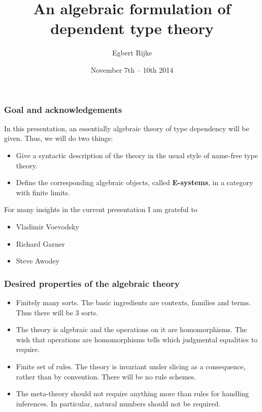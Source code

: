 \documentclass{beamer}
\title{\bf An algebraic formulation of dependent type theory}
\author{Egbert Rijke}
\institute{Carnegie Mellon University\\\texttt{erijke@andrew.cmu.edu}}
\date{November 7th -- 10th 2014}
\newcommand\important[1]{\textbf{\color{red!90!black}#1}}
\begin{document}
\begin{frame}
\titlepage
\end{frame}

\begin{frame}
\frametitle{\bf Goal and acknowledgements}
In this presentation, an essentially algebraic theory of type dependency will be given. Thus, we will
do two things:
\begin{itemize}
\item Give a syntactic description of the theory in the usual style of
name-free type theory.
\item Define the corresponding algebraic objects, called \important{E-systems}, in a category with finite limits.
\end{itemize}
\pause
For many insights in the current presentation I am grateful to
\begin{itemize}
\item Vladimir Voevodsky
\item Richard Garner
\item Steve Awodey
\end{itemize}
\end{frame}

\begin{frame}
\frametitle{\bf Desired properties of the algebraic theory}
\begin{itemize}
\item Finitely many sorts. The basic ingredients are contexts, families and
terms. Thus there will be 3 sorts.
\pause
\item The theory is algebraic and the operations on it are homomorphisms. The
wish that operations are homomorphisms tells which judgmental equalities to
require.
\pause
\item Finite set of rules. The theory is invariant under slicing as a consequence, rather than by
convention. There will be no rule schemes.
\pause
\item The meta-theory should not require anything more than rules for handling
inferences. In particular, natural numbers should not be required.
\end{itemize}
\end{frame}
\end{document}
